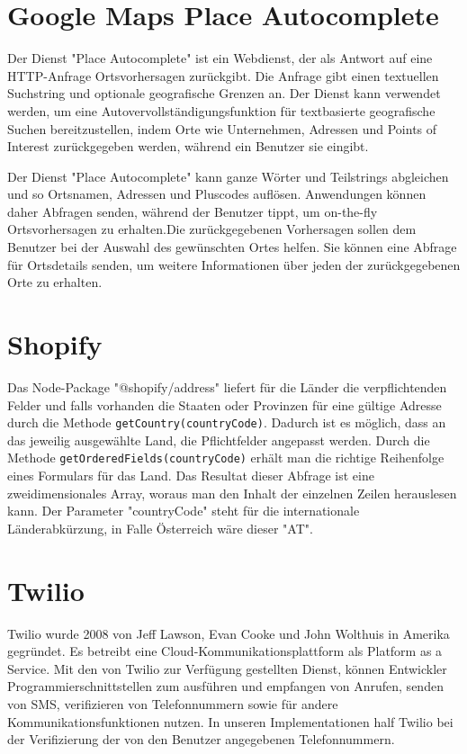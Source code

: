 \section{Google Maps Place Autocomplete}

Der Dienst "Place Autocomplete" ist ein Webdienst, der als Antwort auf eine HTTP-Anfrage Ortsvorhersagen zurückgibt. Die Anfrage gibt einen textuellen Suchstring und optionale geografische Grenzen an. Der Dienst kann verwendet werden, um eine Autovervollständigungsfunktion für textbasierte geografische Suchen bereitzustellen, indem Orte wie Unternehmen, Adressen und Points of Interest zurückgegeben werden, während ein Benutzer sie eingibt.\cite{googlePlacesAPI}

Der Dienst "Place Autocomplete" kann ganze Wörter und Teilstrings abgleichen und so Ortsnamen, Adressen und Pluscodes auflösen. Anwendungen können daher Abfragen senden, während der Benutzer tippt, um on-the-fly Ortsvorhersagen zu erhalten.Die zurückgegebenen Vorhersagen sollen dem Benutzer bei der Auswahl des gewünschten Ortes helfen. Sie können eine Abfrage für Ortsdetails senden, um weitere Informationen über jeden der zurückgegebenen Orte zu erhalten.\cite{googlePlacesAPI}

\section{Shopify}
Das Node-Package "@shopify/address" liefert für die Länder die verpflichtenden Felder und falls vorhanden die Staaten oder Provinzen für eine gültige Adresse durch die Methode \texttt{getCountry(countryCode)}. Dadurch ist es möglich, dass an das jeweilig ausgewählte Land, die Pflichtfelder angepasst werden. Durch die Methode \texttt{getOrderedFields(countryCode)} erhält man die richtige Reihenfolge eines Formulars für das Land. Das Resultat dieser Abfrage ist eine zweidimensionales Array, woraus man den Inhalt der einzelnen Zeilen herauslesen kann. Der Parameter "countryCode" steht für die internationale Länderabkürzung, in Falle Österreich wäre dieser "AT". \autocite{shopifyNPM}

\section{Twilio} \label{sec:twilio}
Twilio wurde 2008 von Jeff Lawson, Evan Cooke und John Wolthuis in Amerika gegründet. Es betreibt eine Cloud-Kommunikationsplattform als Platform as a Service. Mit den von Twilio zur Verfügung gestellten Dienst, können Entwickler Programmierschnittstellen zum ausführen und empfangen von Anrufen, senden von SMS, verifizieren von Telefonnummern sowie für andere Kommunikationsfunktionen nutzen. In unseren Implementationen half Twilio bei der Verifizierung der von den Benutzer angegebenen Telefonnummern. \cite{twilioWebsite}

